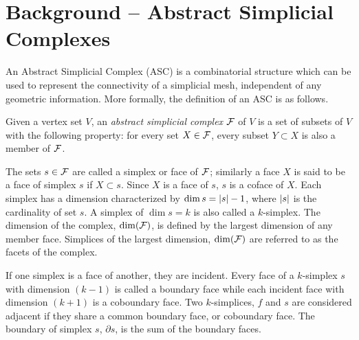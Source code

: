 \section{Background -- Abstract Simplicial Complexes}\label{sec:background}
\par An Abstract Simplicial Complex (ASC) is a combinatorial structure which can be used to represent the connectivity of a simplicial mesh, independent of any geometric information. More formally, the definition of an ASC is as follows.

\begin{definition}
Given a vertex set $V$, an \textit{abstract simplicial complex} $\mathcal{F}$ of $V$ is a set of subsets of $V$ with the following property: for every set $X \in \mathcal{F}$, every subset $Y \subset X$ is also a member of $\mathcal{F}$.
\label{def:asc}
\end{definition}

\par The sets $s \in \mathcal{F}$ are called a simplex or face of $\mathcal{F}$; similarly a face $X$ is said to be a face of simplex $s$ if $X\subset s$. Since $X$ is a face of $s$, $s$ is a coface of $X$. Each simplex has a dimension characterized by $\dim{s} = {\lvert {s} \lvert}-1$, where ${\lvert {s} \lvert}$ is the cardinality of set $s$. A simplex of $\dim{s} = k$ is also called a $k$-simplex. The dimension of the complex, $\dim(\mathcal{F})$, is defined by the largest dimension of any member face. Simplices of the largest dimension, $\dim(\mathcal{F})$ are referred to as the facets of the complex.

\par If one simplex is a face of another, they are incident. Every face of a $k$-simplex $s$ with dimension $(k-1)$ is called a boundary face while each incident face with dimension $(k+1)$ is a coboundary face. Two $k$-simplices, $f$ and $s$ are considered adjacent if they share a common boundary face, or coboundary face. The boundary of simplex $s$, $\partial s$, is the sum of the boundary faces.

